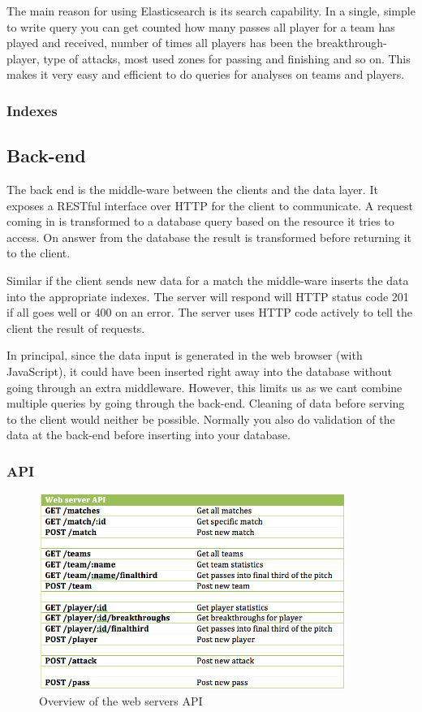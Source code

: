The main reason for using Elasticsearch is its search capability. In a single, simple to write query you can get counted how many passes all player for a team has played and received, number of times all players has been the breakthrough-player, type of attacks, most used zones for passing and finishing and so on. This makes it very easy and efficient to do queries for analyses on teams and players.  

\subsubsection{Indexes}



\subsection{Back-end}

The back end is the middle-ware between the clients and the data layer. It exposes a RESTful interface over HTTP for the client to communicate. A request coming in is transformed to a database query based on the resource it tries to access. On answer from the database the result is transformed before returning it to the client. 

Similar if the client sends new data for a match the middle-ware inserts the data into the appropriate indexes. The server will respond will HTTP status code 201 if all goes well or 400 on an error. The server uses HTTP code actively to tell the client the result of requests.

In principal, since the data input is generated in the web browser (with JavaScript), it could have been inserted right away into the database without going through an extra middleware. However, this limits us as we cant combine multiple queries by going through the back-end. Cleaning of data before serving to the client would neither be possible. Normally you also do validation of the data at the back-end before inserting into your database.

\subsubsection{API}

\begin{figure}[ht!]
\centering
\includegraphics[width=100mm]{images/implementation/API.png}
\caption{Overview of the web servers API}
\label{overflow}
\end{figure}

